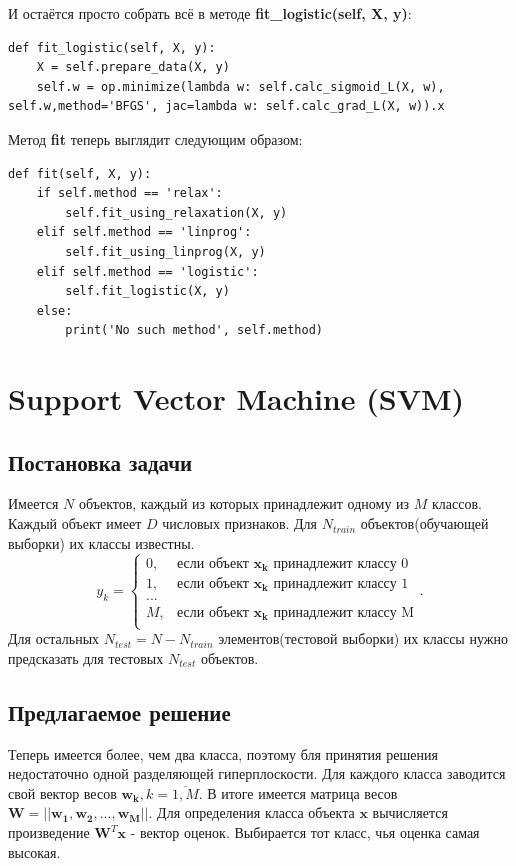 \documentclass[a4paper]{article}
\newcommand{\wk}{\bm{w_k}}
\newcommand{\yk}{y_k}
\newcommand{\xk}{\bm{x_k}}
\newcommand{\W}{\bm{W}}
\begin{document}
И остаётся просто собрать всё в методе \textbf{fit\_logistic(self, X, y)}:
\begin{lstlisting}
def fit_logistic(self, X, y):
	X = self.prepare_data(X, y)
	self.w = op.minimize(lambda w: self.calc_sigmoid_L(X, w), self.w,method='BFGS', jac=lambda w: self.calc_grad_L(X, w)).x
\end{lstlisting}

Метод \textbf{fit} теперь выглядит следующим образом:
\begin{lstlisting}
def fit(self, X, y):
	if self.method == 'relax':
		self.fit_using_relaxation(X, y)
	elif self.method == 'linprog':
		self.fit_using_linprog(X, y)
	elif self.method == 'logistic':
		self.fit_logistic(X, y)
	else:
		print('No such method', self.method)
\end{lstlisting}

\section{Support Vector Machine (SVM)}
\subsection{Постановка задачи}
Имеется $N$ объектов, каждый из которых принадлежит одному из $M$ классов. Каждый объект имеет $D$ числовых признаков. Для $N_{train}$ объектов(обучающей выборки) их классы известны. 
$$\yk = \begin{cases}
0, & \text{если объект } \xk \text{ принадлежит классу 0}\\
1, & \text{если объект } \xk \text{ принадлежит классу 1}\\
...\\
M, & \text{если объект } \xk \text{ принадлежит классу M}\\
\end{cases}.
$$
Для остальных $N_{test} = N - N_{train}$ элементов(тестовой выборки) их классы нужно предсказать для тестовых $N_{test}$ объектов.
\subsection{Предлагаемое решение}
Теперь имеется более, чем два класса, поэтому бля принятия решения недостаточно одной разделяющей гиперплоскости. Для каждого класса заводится свой вектор весов $\wk, k = \overline{1, M}$. В итоге имеется матрица весов $\W = ||\bm{w_1}, \bm{w_2}, ..., \bm{w_M}||$. Для определения класса объекта $\bm{x}$ вычисляется произведение $\W^T\bm{x}$ - вектор оценок. Выбирается тот класс, чья оценка самая высокая.
\end{document}
